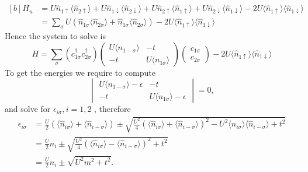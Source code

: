 \begin{questions}
\begin{solution}
 \begin{equation}
  \begin{aligned}[b]
    H_u &= U \hat{n}_{1\uparrow}\langle\hat{n}_{2\uparrow}\rangle +
     U \hat{n}_{1\downarrow}\langle\hat{n}_{2\downarrow}\rangle + U \hat{n}_{2\uparrow}\langle\hat{n}_{1\uparrow}\rangle +
     U \hat{n}_{2\downarrow}\langle\hat{n}_{1\downarrow}\rangle - 2U
     \langle\hat{n}_{1 \uparrow}\rangle \langle\hat{n}_{1\downarrow}\rangle\\
     &= \sum_\sigma U ( \hat{n}_{1\sigma}\langle\hat{n}_{2\sigma}\rangle +
     \hat{n}_{1\sigma}\langle\hat{n}_{2\sigma}\rangle) - 2U
      \langle\hat{n}_{1 \uparrow}\rangle \langle\hat{n}_{1\downarrow}\rangle
  \end{aligned}
 \end{equation}
Hence the system to solve is
\begin{equation}
  H = \sum_\sigma(c_{1\sigma}^\dagger c_{2\sigma}^\dagger)
  \begin{pmatrix}
    U \langle n_{1-\sigma}\rangle & -t\\
    -t & U \langle n_{1\sigma}\rangle
  \end{pmatrix}
  \begin{pmatrix}
    c_{1\sigma}\\
    c_{2\sigma}
  \end{pmatrix}
  - 2U
   \langle\hat{n}_{1 \uparrow}\rangle \langle\hat{n}_{1\downarrow}\rangle
\end{equation}
To get the energies we require to compute
\begin{equation}
  \begin{vmatrix}
    U \langle n_{1-\sigma}\rangle- \epsilon & -t\\
    -t & U \langle n_{1\sigma}\rangle- \epsilon
  \end{vmatrix} = 0,
\end{equation}
and solve for $\epsilon_{i\sigma}, i=1,2$ , therefore
\begin{equation}
  \begin{aligned}
   \epsilon_{i\sigma} &= \frac{U}{2}(\langle\hat{n}_{i \sigma}\rangle +  \langle\hat{n}_{i-\sigma}\rangle) \pm \sqrt{\frac{U^2}{4}(\langle\hat{n}_{i \sigma}\rangle +  \langle\hat{n}_{i-\sigma}\rangle)^2  - U^2 \langle\hat{n}_{i \sigma}\rangle \langle\hat{n}_{i-\sigma}\rangle + t^2}\\
   &= \frac{U}{2}n_i \pm \sqrt{\frac{U^2}{4}(\langle\hat{n}_{i \sigma}\rangle -  \langle\hat{n}_{i-\sigma}\rangle)^2 + t^2}\\
   &= \frac{U}{2}n_i \pm \sqrt{U^2 m^2 + t^2}.

\end{aligned}
\end{equation}
\end{solution}
\end{questions}
